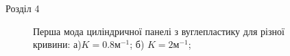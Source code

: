 \documentclass[8pt]{beamer}
\numberwithin{figure}{section}
\numberwithin{equation}{section}
\numberwithin{table}{section}
\begin{document}
\begin{frame}{Розділ 4}

\begin{figure}[h]
\begin{minipage}[h]{0.49\linewidth}
\end{minipage}
\hfill
\begin{minipage}[h]{0.49\linewidth}
\end{minipage}
\caption{Перша мода циліндричної панелі з вуглепластику для різної кривини: а)$K=0.8\text{м}^{-1}$; б)   $K=2\text{м}^{-1}$;}
\end{figure}

\end{frame}
\end{document}
